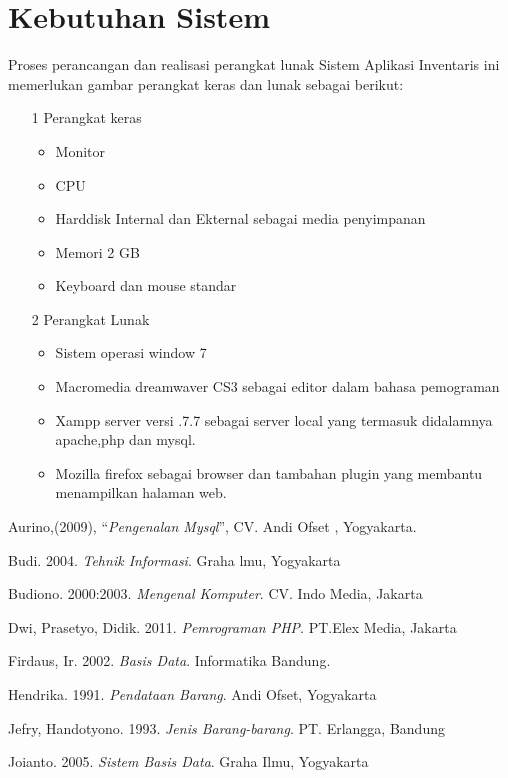 \documentclass{jtetiproposalskripsi}
\begin{document}
\section{Kebutuhan Sistem}
Proses  perancangan  dan  realisasi  perangkat  lunak  Sistem  Aplikasi  Inventaris  ini memerlukan gambar perangkat keras dan lunak sebagai berikut:
\begin{itemize}
\item[1]Perangkat keras
\begin{itemize}
\item Monitor
\item CPU
\item Harddisk  Internal dan Ekternal sebagai media penyimpanan
\item Memori 2 GB
\item Keyboard dan mouse standar
\end{itemize}

\item[2] Perangkat Lunak
\begin{itemize}
\item Sistem operasi window 7
\item Macromedia dreamwaver CS3 sebagai editor dalam bahasa pemograman
\item Xampp server versi .7.7 sebagai server local yang termasuk  didalamnya apache,php dan mysql.
\item Mozilla   firefox   sebagai   browser   dan   tambahan   plugin   yang   membantu menampilkan halaman web.
\end{itemize}
\end{itemize}



\begin{thebibliography}{9}

Aurino,(2009), ``\textit{Pengenalan Mysql}'', CV. Andi Ofset , Yogyakarta.

Budi. 2004. \textit{Tehnik Informasi}. Graha lmu, Yogyakarta

Budiono. 2000:2003. \textit{Mengenal Komputer}. CV. Indo Media, Jakarta

Dwi, Prasetyo, Didik. 2011. \textit{Pemrograman PHP}. PT.Elex Media, Jakarta

Firdaus, Ir. 2002. \textit{Basis Data}. Informatika Bandung.

Hendrika. 1991. \textit{Pendataan Barang}. Andi Ofset, Yogyakarta

Jefry, Handotyono. 1993. \textit{Jenis Barang-barang}. PT. Erlangga, Bandung

Joianto. 2005. \textit{Sistem Basis Data}. Graha Ilmu, Yogyakarta

\end{thebibliography}
\end{document}
